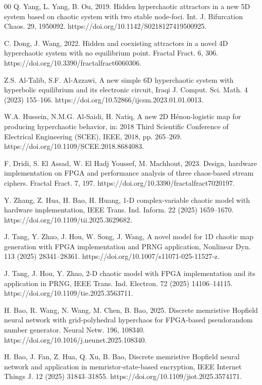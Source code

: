 \documentclass[preprint, 12pt, sort&compress]{elsarticle}
\begin{document}
\begin{thebibliography}{00}
Q. Yang, L. Yang, B. Ou, 2019. Hidden hyperchaotic attractors in a new 5D system based on chaotic system with two stable node-foci. Int. J. Bifurcation Chaos. 29, 1950092. https://doi.org/10.1142/S0218127419500925.

C. Dong, J. Wang, 2022. Hidden and coexisting attractors in a novel 4D hyperchaotic system with no equilibrium point. Fractal Fract. 6, 306. https://doi.org/10.3390/fractalfract6060306.

Z.S. Al-Talib, S.F. Al-Azzawi, A new simple 6D hyperchaotic system with hyperbolic equilibrium and its electronic circuit, Iraqi J. Comput. Sci. Math. 4 (2023) 155–166. https://doi.org/10.52866/ijcsm.2023.01.01.0013.

W.A. Hussein, N.M.G. Al-Saidi, H. Natiq, A new 2D Hénon-logistic map for producing hyperchaotic behavior, in: 2018 Third Scientific Conference of Electrical Engineering (SCEE), IEEE, 2018, pp. 265–269. https://doi.org/10.1109/SCEE.2018.8684083.

F. Dridi, S. El Assad, W. El Hadj Youssef, M. Machhout, 2023. Design, hardware implementation on FPGA and performance analysis of three chaos-based stream ciphers. Fractal Fract. 7, 197. https://doi.org/10.3390/fractalfract7020197.

Y. Zhang, Z. Hua, H. Bao, H. Huang, 1-D complex-variable chaotic model with hardware implementation, IEEE Trans. Ind. Inform. 22 (2025) 1659–1670. https://doi.org/10.1109/tii.2025.3629682.

J. Tang, Y. Zhao, J. Hou, W. Song, J. Wang, A novel model for 1D chaotic map generation with FPGA implementation and PRNG application, Nonlinear Dyn. 113 (2025) 28341–28361. https://doi.org/10.1007/s11071-025-11527-z.

J. Tang, J. Hou, Y. Zhao, 2-D chaotic model with FPGA implementation and its application in PRNG, IEEE Trans. Ind. Electron. 72 (2025) 14106–14115. https://doi.org/10.1109/tie.2025.3563711.

H. Bao, R. Wang, N. Wang, M. Chen, B. Bao, 2025. Discrete memristive Hopfield neural network with grid-polyhedral hyperchaos for FPGA-based pseudorandom number generator. Neural Netw. 196, 108340. https://doi.org/10.1016/j.neunet.2025.108340.

H. Bao, J. Fan, Z. Hua, Q. Xu, B. Bao, Discrete memristive Hopfield neural network and application in memristor-state-based encryption, IEEE Internet Things J. 12 (2025) 31843–31855. https://doi.org/10.1109/jiot.2025.3574171.


\end{thebibliography}
\end{document}
